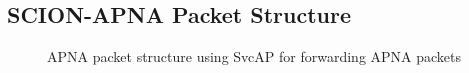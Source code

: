 \subsection{SCION-APNA Packet Structure}
\begin{figure}[th!!]
\centering
\noindent
{}
\decoRule
\caption[APNA packet structure using SvcAP]{APNA packet structure  using SvcAP for forwarding APNA packets}
\end{figure}